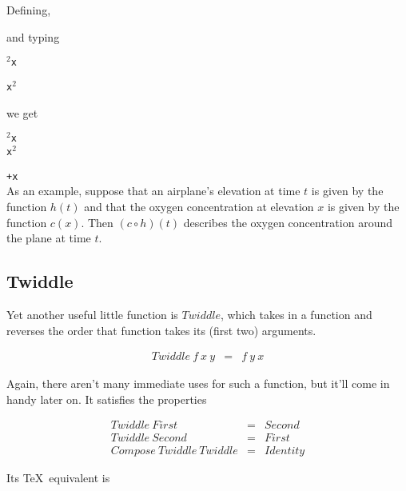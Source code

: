 \noindent Defining,

\begin{teX}
\def\goo#1{#1}
\def\foo#1{#1$^2$}
\end{teX}
\def\goo#1{#1}
\def\foo#1{#1$^2$}


and typing
\begin{teX}
\texttt{\Compose\foo\goo{x}}

\texttt{\Compose\goo\foo{x}}
\end{teX}

\noindent we get 

\texttt{\Compose\foo\goo{x}}\\
\texttt{\Compose\goo\foo{x}}\\

\def\goo#1{#1}
\def\foo#1{#1+#1}

\texttt{\Compose\foo\goo{x}}\\

As an example, suppose that an airplane's elevation at time $t$ is given by the function $h(t)$ and that the oxygen concentration at elevation $x$ is given by the function $c(x)$. Then $(c \circ h)(t)$ describes the oxygen concentration around the plane at time $t$.


\subsection{Twiddle}

Yet another useful little function is $Twiddle$, which takes in 
a function and reverses the order that function takes its (first two)
arguments.

\begin{eqnarray*}
   Twiddle~f~x~y  &  =  &  f~y~x
\end{eqnarray*}

Again, there aren't many immediate uses for such a function, but it'll
come in handy later on.  It satisfies the properties

\begin{eqnarray*}
              Twiddle~First  &  =  &  Second  \\
             Twiddle~Second  &  =  &  First  \\
    Compose~Twiddle~Twiddle  &  =  &  Identity
\end{eqnarray*}

Its \TeX\ equivalent is
\begin{teX}
\def\Twiddle#1#2#3{#1{#3}{#2}}
\end{teX}

